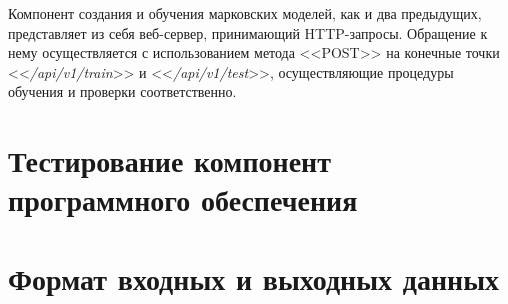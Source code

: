 Компонент создания и обучения марковских моделей, как и два предыдущих, представляет из себя веб-сервер, принимающий HTTP-запросы. Обращение к нему осуществляется с использованием метода <<POST>> на конечные точки <<\textit{/api/v1/train}>> и <<\textit{/api/v1/test}>>, осуществляющие процедуры обучения и проверки соответственно.

\section{Тестирование компонент программного обеспечения}


\section{Формат входных и выходных данных}

